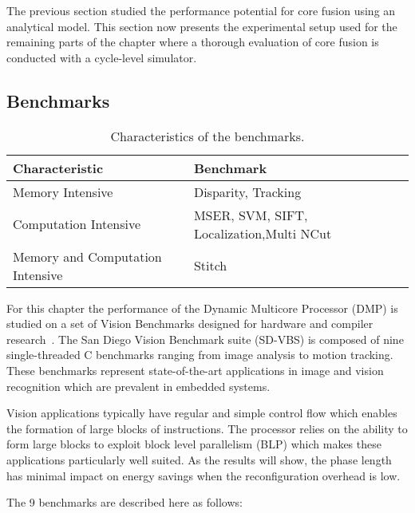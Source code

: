 The previous section studied the performance potential for core fusion using an analytical model.
This section now presents the experimental setup used for the remaining parts of the chapter where a thorough evaluation of core fusion is conducted with a cycle-level simulator.

\subsection{Benchmarks}

\begin{table}[t]
  \small
  \centering
 \begin{tabular} { | l | l | }
 \hline
   \cellcolor[gray]{0.7}Characteristic & \cellcolor[gray]{0.7} Benchmark\\ \hline
    Memory Intensive & Disparity, Tracking\\ \hline
	Computation Intensive & MSER, SVM, SIFT, Localization,Multi NCut\\\hline
	Memory and Computation Intensive & Stitch\\ \hline
   \end{tabular}
  \caption{Characteristics of the benchmarks.}\label{tab:sd-vbschar}
\end{table}

For this chapter the performance of the Dynamic Multicore Processor (DMP) is studied on a set of Vision Benchmarks designed for hardware and compiler research~\cite{sdvbs}.
The San Diego Vision Benchmark suite (SD-VBS) is composed of nine single-threaded C benchmarks ranging from image analysis to motion tracking.
These benchmarks represent state-of-the-art applications in image and vision recognition which are prevalent in embedded systems.

Vision applications typically have regular and simple control flow which enables the formation of large blocks of instructions.
The processor relies on the ability to form large blocks to exploit block level parallelism (BLP) which makes these applications particularly well suited.
As the results will show, the phase length has minimal impact on energy savings when the reconfiguration overhead is low.

The 9 benchmarks are described here as follows:

